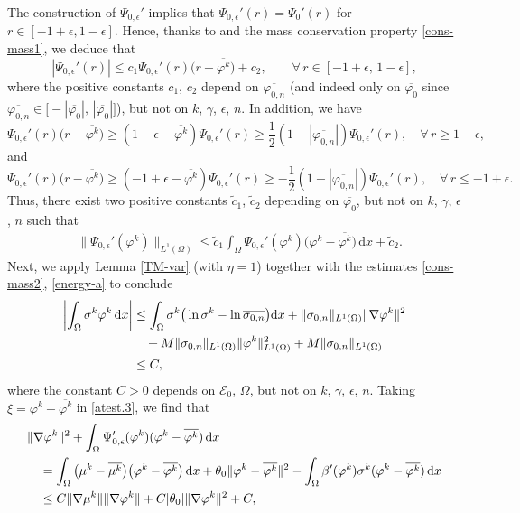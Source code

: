 \documentclass[11pt,reqno]{amsart}
\begin{document}
The construction of $\Psi_{0,\epsilon}'$ implies that   $\Psi_{0,\epsilon}'(r)=\Psi_0'(r)$ for $r\in [-1+\epsilon,1-\epsilon]$. Hence, thanks to \cite[Proposition A.1]{MZ04} and the mass conservation property \eqref{cons-mass1}, we deduce that
$$
|\Psi_{0,\epsilon}'(r)|\leq c_1 \Psi_{0,\epsilon}'(r)\big( r - \overline{\varphi^k}\big)+c_2,
\qquad \forall\, r\in [-1+\epsilon,\,1-\epsilon],
$$
where the positive constants $c_1$, $c_2$ depend on $\overline{\varphi_{0,n}}$ (and indeed only on $\overline{\varphi_{0}}$ since $\overline{\varphi_{0,n}} \in \big[-|\overline{\varphi_{0}}|,\,|\overline{\varphi_{0}}|\big]$), but not on $k$, $\gamma$, $\epsilon$, $n$.
In addition, we have
$$
\Psi_{0,\epsilon}'(r)\big(r-\overline{\varphi^k}\big)\geq \left(1-\epsilon-\overline{\varphi^k}\right)\Psi_{0,\epsilon}'(r) \geq \frac12(1-|\overline{\varphi_{0,n}}|)\Psi_{0,\epsilon}'(r),\quad \forall\, r\geq 1-\epsilon,
$$
and
$$
\Psi_{0,\epsilon}'(r)\big(r-\overline{\varphi^k}\big)\geq \left(-1+\epsilon-\overline{\varphi^k}\right)\Psi_{0,\epsilon}'(r)\geq -\frac12(1-|\overline{\varphi_{0,n}}|)\Psi_{0,\epsilon}'(r),\quad \forall\, r\leq -1+\epsilon.
$$
Thus, there exist two positive constants $\widetilde{c}_1$, $\widetilde{c}_2$ depending on $\overline{\varphi_{0}}$, but not on $k$, $\gamma$, $\epsilon$, $n$ such that
%
\begin{align}
& \|\Psi_{0,\epsilon}'(\varphi^k)\|_{L^1(\Omega)}\leq \widetilde{c}_1 \int_\Omega \Psi_{0,\epsilon}'(\varphi^k)\big(\varphi^k-\overline{\varphi^k}\big)\,\mathrm{d}x +\widetilde{c}_2.
\label{Psi-L1}
\end{align}
%
Next, we apply Lemma \ref{TM-var} (with $\eta=1$) together with the estimates \eqref{cons-mass2}, \eqref{energy-a} to conclude
%
\begin{align}
\left|\int_{\Omega}  \sigma^k \varphi^k\, \mathrm{d}x\right|
 &\leq   \int_{\Omega} \sigma^k\big(\ln \sigma^k - \ln \overline{\sigma_{0,n}}\big)\mathrm{d}x + \|\sigma_{0,n}\|_{L^1(\Omega)}\|\nabla \varphi^k\|^2
 \notag \\
&\quad + M  \|\sigma_{0,n}\|_{L^1(\Omega)} \|\varphi^k\|_{L^1(\Omega)}^2 + M\|\sigma_{0,n}\|_{L^1(\Omega)}
\notag\\
&\leq C,
\label{Lowerbd-1}
\end{align}
where the constant $C>0$ depends on $\mathcal{E}_0$, $\Omega$, but not on $k$, $\gamma$, $\epsilon$, $n$.
%
Taking $\xi=\varphi^k-\overline{\varphi^k}$ in \eqref{atest.3}, we find that
%
\begin{align}
&   \|\nabla \varphi^k\|^2+ \int_\Omega \Psi_{0,\epsilon}'(\varphi^k) (\varphi^k-\overline{\varphi^k})\,\mathrm{d}x
\notag \\
&\quad = \int_\Omega \big(\mu^k-\overline{\mu^k}\big) \big( \varphi^k-\overline{\varphi^k}\big) \,\mathrm{d}x
+ \theta_0\|\varphi^k-\overline{\varphi^k}\|^2
- \int_\Omega \beta'(\varphi^k)\sigma^k(\varphi^k-\overline{\varphi^k})\,\mathrm{d}x
\notag \\
&\quad \leq C\|\nabla \mu^k\|\|\nabla \varphi^k\|+ C|\theta_0|\|\nabla \varphi^k\|^2
+C,
\label{Psi-L2}
\end{align}
\end{document}
